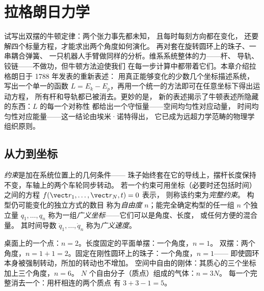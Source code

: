 \chapter{拉格朗日力学}\label{ch:b3:lagrangian-mechanics}

试写出双摆的牛顿定律：两个张力事先都未知，
且每时每刻方向都在变化，
还要解四个标量方程，才能求出两个角度如何演化。
再对套在旋转圆环上的珠子、一串耦合弹簧、
一只机器人手臂做同样的分析。维系系统整体的力——杆、
导轨、铰链——不做功，但牛顿方法迫使我们
在每一步计算中都带着它们。本章介绍拉格朗日于 1788 年发表的重新表述：
用真正能够变化的少数几个坐标描述系统，
写出一个单一的函数
$L = E_k - E_p$，再用一个统一的方法即可在任意坐标下得出运动方程，
所有杆和导轨都已被消去。更妙的是，
新的表述揭示了牛顿表述所隐藏的东西：$L$ 的每一个对称性
都给出一个守恒量——空间均匀性对应动量，
时间均匀性对应能量——这一结论由埃米·诺特得出，
它已成为远超力学范畴的物理学组织原则。

\section{从力到坐标}

\begin{definition}\label{def:b3:lagrangian-mechanics:coordinates}
\emph{约束}是加在系统位置上的几何条件——
珠子始终套在它的导线上，摆杆长度保持不变，车轴上的两个车轮同步转动。
若一个约束可用坐标（必要时还包括时间）之间的方程
$f(\vect r_1, \dots, \vect r_N, t) = 0$ 表示，
则称该约束为\emph{完整约束}。
构型仍可能变化的独立方式的数目
称为\emph{自由度} $n$；能完全确定构型的任一组 $n$ 个独立量
$q_1, \dots, q_n$ 称为一组\emph{广义坐标}——它们可以是角度、长度，
或任何方便的混合量。
其时间导数 $\dot q_1, \dots, \dot q_n$
称为\emph{广义速度}。
\end{definition}

\begin{example}[自由度计数]\label{ex:b3:lagrangian-mechanics:counting}
桌面上的一个点：$n = 2$。长度固定的平面单摆：一个角度，$n = 1$。
双摆：两个角度，$n = 1 + 1 = 2$。固定在刚性圆环上的珠子：一个角度，$n = 1$——
即使圆环本身被强制转动，所加的转动也不增加。
空间中自由的刚体：其质心的三个坐标
加上三个角度，$n = 6$。
$N$ 个自由分子（质点）组成的气体：$n = 3N$。
每一个完整消去一个：用杆相连的两个质点
有 $3 + 3 - 1 = 5$。
\end{example}

